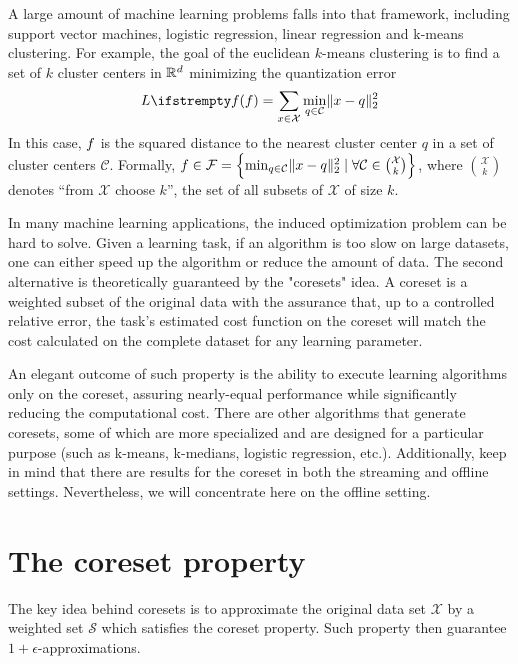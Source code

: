 A large amount of machine learning problems falls into that framework, including support vector machines, logistic regression, linear regression and k-means clustering. For example, the goal of the euclidean $k$-means clustering is to find a set of $k$ cluster centers in $\mathbb{R}^d$ minimizing the quantization error
\begin{equation*}
\loss{\query} = \sum_{x \in \mathcal{X}} \min_{q \in \mathcal{C} } \lVert x - q \rVert^2_2
\end{equation*}
In this case, $f$ is the squared distance to the nearest cluster center $q$ in a set of cluster centers $\mathcal{C}$. Formally, $f  \in \mathcal{F} = \left\{\min_{q \in \mathcal{C} } \lVert x - q \rVert^2_2 \mid \forall \mathcal{C}  \in \binom{\mathcal{X}}{k}\right\}  $, where $\binom{\mathcal{X}}{k}$ denotes ``from $\mathcal{X}$ choose $k$'', the set of all subsets of $\mathcal{X}$ of size $k$.

In many machine learning applications, the induced optimization problem can be hard to solve. Given a learning task, if an algorithm is too slow on large datasets, one can either speed up the algorithm or reduce the amount of data.
The second alternative is theoretically guaranteed by the "coresets" idea.
A coreset is a weighted subset of the original data with the assurance that, up to a controlled relative error, the task's estimated cost function on the coreset will match the cost calculated on the complete dataset for any learning parameter.

An elegant outcome of such property is the ability to execute learning algorithms only on the coreset, assuring nearly-equal performance while significantly reducing the computational cost. There are other algorithms that generate coresets, some of which are more specialized and are designed for a particular purpose (such as k-means, k-medians, logistic regression, etc.). Additionally, keep in mind that there are results for the coreset in both the streaming and offline settings. Nevertheless, we will concentrate here on the offline setting.


\section{The coreset property}

The key idea behind coresets is to approximate the original data
set $\mathcal{X}$ by a weighted set $\mathcal{S}$ which satisfies the coreset property. Such property then guarantee $1+\epsilon$-approximations.

